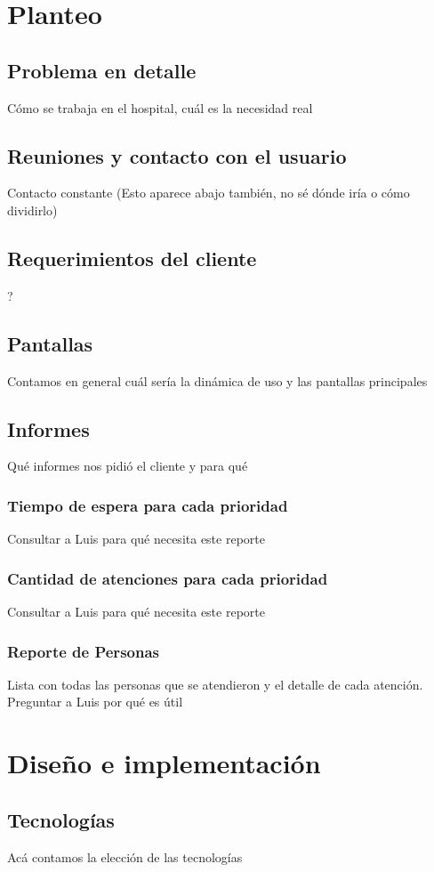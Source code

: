 \documentclass[a4paper,10pt]{article}
\begin{document}
\newpage 
\section{Planteo}
\subsection{Problema en detalle}
Cómo se trabaja en el hospital, cuál es la necesidad real
\subsection{Reuniones y contacto con el usuario}
Contacto constante (Esto aparece abajo también, no sé dónde iría o cómo dividirlo)
\subsection{Requerimientos del cliente}
?
\subsection{Pantallas}
Contamos en general cuál sería la dinámica de uso y las pantallas principales
\subsection{Informes}
Qué informes nos pidió el cliente y para qué
\subsubsection{Tiempo de espera para cada prioridad}
Consultar a Luis para qué necesita este reporte
\subsubsection{Cantidad de atenciones para cada prioridad}
Consultar a Luis para qué necesita este reporte
\subsubsection{Reporte de Personas}
Lista con todas las personas que se atendieron y el detalle de cada atención. Preguntar a Luis por qué es útil

\newpage 
\section{Diseño e implementación}
\subsection{Tecnologías}
Acá contamos la elección de las tecnologías
\end{document}
